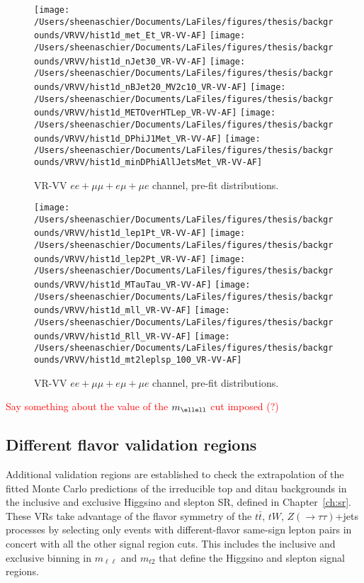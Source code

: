 \begin{figure}
    \centering
        \texttt{[image: /Users/sheenaschier/Documents/LaFiles/figures/thesis/backgrounds/VRVV/hist1d\_met\_Et\_VR-VV-AF]}
        \texttt{[image: /Users/sheenaschier/Documents/LaFiles/figures/thesis/backgrounds/VRVV/hist1d\_nJet30\_VR-VV-AF]}
        \texttt{[image: /Users/sheenaschier/Documents/LaFiles/figures/thesis/backgrounds/VRVV/hist1d\_nBJet20\_MV2c10\_VR-VV-AF]}
        \texttt{[image: /Users/sheenaschier/Documents/LaFiles/figures/thesis/backgrounds/VRVV/hist1d\_METOverHTLep\_VR-VV-AF]}
        \texttt{[image: /Users/sheenaschier/Documents/LaFiles/figures/thesis/backgrounds/VRVV/hist1d\_DPhiJ1Met\_VR-VV-AF]}
        \texttt{[image: /Users/sheenaschier/Documents/LaFiles/figures/thesis/backgrounds/VRVV/hist1d\_minDPhiAllJetsMet\_VR-VV-AF]}
    \caption{VR-VV $ee+\mu\mu +e\mu + \mu e$ channel, pre-fit distributions.}
    \label{fig:VR-VV-AF-set1vars}
\end{figure} 


\begin{figure}
    \centering
        \texttt{[image: /Users/sheenaschier/Documents/LaFiles/figures/thesis/backgrounds/VRVV/hist1d\_lep1Pt\_VR-VV-AF]}
        \texttt{[image: /Users/sheenaschier/Documents/LaFiles/figures/thesis/backgrounds/VRVV/hist1d\_lep2Pt\_VR-VV-AF]}
        \texttt{[image: /Users/sheenaschier/Documents/LaFiles/figures/thesis/backgrounds/VRVV/hist1d\_MTauTau\_VR-VV-AF]}
        \texttt{[image: /Users/sheenaschier/Documents/LaFiles/figures/thesis/backgrounds/VRVV/hist1d\_mll\_VR-VV-AF]}
        \texttt{[image: /Users/sheenaschier/Documents/LaFiles/figures/thesis/backgrounds/VRVV/hist1d\_Rll\_VR-VV-AF]}
        \texttt{[image: /Users/sheenaschier/Documents/LaFiles/figures/thesis/backgrounds/VRVV/hist1d\_mt2leplsp\_100\_VR-VV-AF]}
    \caption{VR-VV $ee+\mu\mu +e\mu + \mu e$ channel, pre-fit distributions.}
    \label{fig:VR-VV-AF-set3vars}
\end{figure}
\textcolor{red}{Say something about the value of the $m_{\ellell}$ cut imposed (?)}

\subsection{Different flavor validation regions}
Additional validation regions are established to check the extrapolation of the fitted Monte Carlo predictions of the irreducible top and ditau backgrounds in the inclusive and exclusive Higgsino and slepton SR, defined in Chapter~\ref{ch:sr}.  These VRs take advantage of the flavor symmetry of the $t\bar{t}$, $tW$, $Z(\rightarrow\tau\tau)$+jets processes by selecting only events with different-flavor same-sign lepton pairs in concert with all the other signal region cuts.  This includes the inclusive and exclusive binning in $m_{\ell\ell}$ and $m_{t2}$ that define the Higgsino and slepton signal regions.


